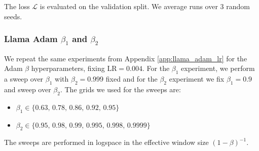 \documentclass{article} %
\begin{document}
\noindent 
The loss \(\mathcal{L}\) is evaluated on the validation split. We average runs over 3 random seeds.

\subsubsection{\texorpdfstring{Llama Adam $\beta_1$ and $\beta_2$}{Llama Adam beta1 and beta2}}\label{app:adam_betas}
We repeat the same experiments from Appendix \ref{app:llama_adam_lr} for the Adam $\beta$ hyperparameters, fixing $\mathrm{LR} = 0.004$. For the $\beta_1$ experiment, we perform a sweep over $\beta_1$ with $\beta_2 = 0.999$ fixed and for the $\beta_2$ experiment we fix $\beta_1 = 0.9$ and sweep over $\beta_2$. The grids we used for the sweeps are:
\begin{itemize}
    \item $\beta_1 \in \{0.63,\, 0.78,\, 0.86,\, 0.92,\, 0.95\}$
    \item $\beta_2 \in \{0.95,\, 0.98,\, 0.99,\, 0.995,\, 0.998,\, 0.9999\}$
\end{itemize}
The sweeps are performed in logspace in the effective window size $(1 - \beta)^{-1}$. 
\end{document}
